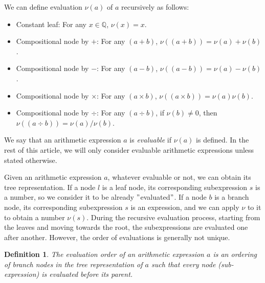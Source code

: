 \documentclass{article}
\newtheorem{definition}{Definition}
\numberwithin{definition}{section}
\numberwithin{lemma}{section}
\numberwithin{proposition}{section}
\numberwithin{corollary}{section}
\numberwithin{theorem}{section}
\begin{document}
We can define evaluation $\nu(a)$ of $a$ recursively as follows:
\begin{itemize}
    \item Constant leaf: For any $x \in \mathbb{Q}$, $\nu(x) = x$.
    \item Compositional node by $+$: For any $(a + b)$, $\nu((a + b)) = \nu(a) + \nu(b)$.
    \item Compositional node by $-$: For any $(a - b)$, $\nu((a - b)) = \nu(a) - \nu(b)$.
    \item Compositional node by $\times$: For any $(a \times b)$, $\nu((a \times b)) = \nu(a) \nu(b)$.
    \item Compositional node by $\div$: For any $(a \div b)$, if $\nu(b) \neq 0$, then $\nu((a \div b)) = \nu(a) / \nu(b)$.
\end{itemize}

We say that an arithmetic expression $a$ is \emph{evaluable} if $\nu(a)$ is defined.
In the rest of this article, we will only consider evaluable arithmetic expressions unless stated otherwise.

Given an arithmetic expression $a$, whatever evaluable or not, we can obtain its tree representation.
If a node $l$ is a leaf node, its corresponding subexpression $s$ is a number, so we consider it to be already \("\)evaluated\("\).
If a node $b$ is a branch node, its corresponding subexpression $s$ is an expression, and we can apply $\nu$ to it to obtain a number $\nu(s)$.
During the recursive evaluation process, starting from the leaves and moving towards the root, the subexpressions are evaluated one after another.
However, the order of evaluations is generally not unique.

\begin{definition}
    The evaluation order of an arithmetic expression $a$ is an ordering of branch nodes in the tree representation of $a$
    such that every node (sub-expression) is evaluated before its parent.
\end{definition}
\end{document}
